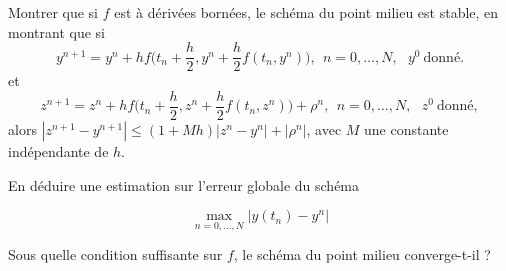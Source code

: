 \item Montrer que si $f$ est à dérivées bornées, le schéma du point milieu est stable, en montrant que 
si 
 $$
    y^{n+1} = y^n+hf\Big(t_{n}+\frac{h}{2},y^n+\frac{h}{2}f(t_n,y^n)\Big),\ \ n=0,\dots,N,\ \ \ y^0\ \textrm{donné}. 
    $$
et
 $$
    z^{n+1} = z^n+hf\Big(t_{n}+\frac{h}{2},z^n+\frac{h}{2}f(t_n,z^n)\Big)+\rho^n,\ \ n=0,\dots,N,\ \ \ z^0\ \textrm{donné}, 
    $$
alors $|z^{n+1}-y^{n+1}|\leq(1+Mh)|z^n-y^n|+|\rho^n|$,
avec $M$ une constante indépendante de $h$.

En déduire une estimation sur l'erreur globale du schéma

$$
\max_{n=0,\dots,N}|y(t_n)-y^n|
$$

\item Sous quelle condition suffisante sur $f$, le schéma du point milieu converge-t-il ?
\een
\ee


